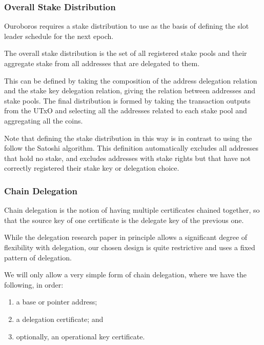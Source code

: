 \documentclass[11pt,a4paper]{article}
\begin{document}
\subsubsection{Overall Stake Distribution}
\label{overall-stake-distribution}

Ouroboros \citep{ouroboros_classic} requires a stake distribution to
use as the basis of defining the slot leader schedule for the next
epoch.

The overall stake distribution is the set of all registered stake pools
and their aggregate stake from all addresses that are delegated to them.

This can be defined by taking the composition of the address delegation
relation and the stake key delegation relation, giving the relation
between addresses and stake pools. The final distribution is formed by
taking the transaction outputs from the UTxO and selecting all the
addresses related to each stake pool and aggregating all the coins.

Note that defining the stake distribution in this way is in contrast to
using the follow the Satoshi algorithm. This definition automatically
excludes all addresses that hold no stake, and excludes addresses with
stake rights but that have not correctly registered their stake key or
delegation choice.

\subsubsection{Chain Delegation}
\label{chain-delegation}

Chain delegation is the notion of having multiple certificates chained
together, so that the source key of one certificate is the delegate key
of the previous one.

While the delegation research paper in principle allows a significant
degree of flexibility with delegation, our chosen design is quite
restrictive and uses a fixed pattern of delegation.

We will only allow a very simple form of chain delegation, where we have
the following, in order:

\begin{enumerate}
\item
  a base or pointer address;
\item
  a delegation certificate; and
\item
  optionally, an operational key certificate.
\end{enumerate}
\end{document}

